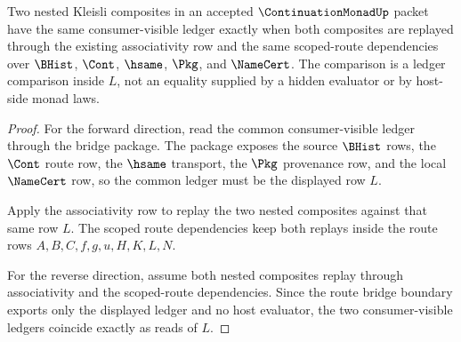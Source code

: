 \begin{theorem}
\label{thm:continuation-monad-kleisli-ledger-associativity}
Two nested Kleisli composites in an accepted $\ContinuationMonadUp$ packet have the same consumer-visible ledger exactly when both composites are replayed through the existing associativity row and the same scoped-route dependencies over $\BHist$, $\Cont$, $\hsame$, $\Pkg$, and $\NameCert$. The comparison is a ledger comparison inside $L$, not an equality supplied by a hidden evaluator or by host-side monad laws.
\end{theorem}
\begin{proof}
For the forward direction, read the common consumer-visible ledger through the bridge package. The package exposes the source $\BHist$ rows, the $\Cont$ route row, the $\hsame$ transport, the $\Pkg$ provenance row, and the local $\NameCert$ row, so the common ledger must be the displayed row $L$.

Apply the associativity row to replay the two nested composites against that same row $L$. The scoped route dependencies keep both replays inside the route rows $A,B,C,f,g,u,H,K,L,N$.

For the reverse direction, assume both nested composites replay through associativity and the scoped-route dependencies. Since the route bridge boundary exports only the displayed ledger and no host evaluator, the two consumer-visible ledgers coincide exactly as reads of $L$.
\end{proof}

